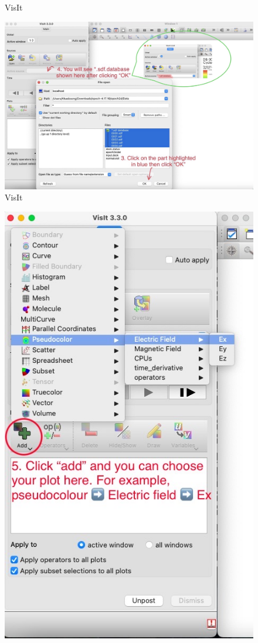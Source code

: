 \documentclass{article}
\begin{document}
\begin{enumerate}
\begin{figure}[htp]
        \caption{VisIt}
        \label{fig:my_label}
    \end{figure}
    \begin{figure}[htp]
        \centering
        \includegraphics[scale=0.2]{Visit3.jpg}
        \caption{VisIt}
        \label{fig:my_label}
    \end{figure}
        \begin{figure}[htp]
        \centering
        \includegraphics[scale=0.3]{visit4.jpg}

\end{figure}
\end{enumerate}
\end{document}
